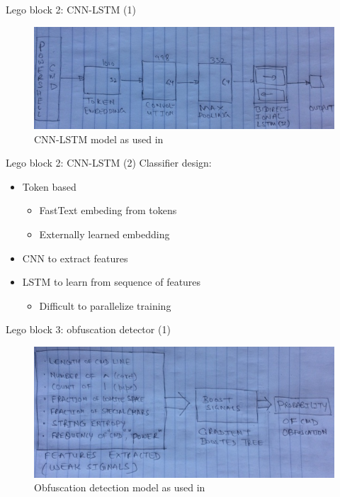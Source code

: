 \documentclass[10pt]{beamer}
\begin{document}
\begin{frame}{Lego block 2: CNN-LSTM (1)}
	\begin{figure}
		\includegraphics[scale=0.50]{cnn-lstm}
		\caption{CNN-LSTM model as used in \cite{amsi2019}}
	\end{figure}
\end{frame}

\begin{frame}{Lego block 2: CNN-LSTM (2)}
	Classifier design:
	\begin{itemize}
		\item Token based
		\begin{itemize}
			\item FastText embeding from tokens
			\item Externally learned embedding
		\end{itemize}
		\item CNN to extract features
		\item LSTM to learn from sequence of features
		\begin{itemize}
			\item Difficult to parallelize training
		\end{itemize}
	\end{itemize}
\end{frame}

\begin{frame}{Lego block 3: obfuscation detector (1)}
	\begin{figure}
		\includegraphics[scale=0.50]{gbtree}
		\caption{Obfuscation detection model as used in \cite{feye2018}}
	\end{figure}
\end{frame}
\end{document}
